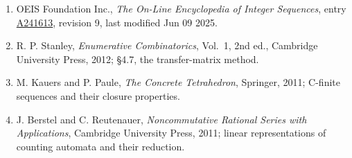 \documentclass[11pt]{article}
\theoremstyle{definition}
\begin{document}
\begin{enumerate}

\item OEIS Foundation Inc., \emph{The On-Line Encyclopedia of Integer Sequences}, entry \href{https://oeis.org/A241613}{A241613}, revision 9, last modified Jun 09 2025.

\item R. P. Stanley, \emph{Enumerative Combinatorics}, Vol.~1, 2nd ed., Cambridge University Press, 2012; \S4.7, the transfer-matrix method.

\item M. Kauers and P. Paule, \emph{The Concrete Tetrahedron}, Springer, 2011; C-finite sequences and their closure properties.

\item J. Berstel and C. Reutenauer, \emph{Noncommutative Rational Series with Applications}, Cambridge University Press, 2011; linear representations of counting automata and their reduction.

\end{enumerate}
\end{document}

